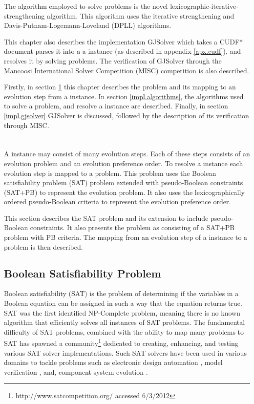 The algorithm employed to solve \modelimpl problems is the novel lexicographic-iterative-strengthening algorithm.
This algorithm uses the iterative strengthening \citep{calistri1994iterative, le2010sat4j} and Davis-Putnam-Logemann-Loveland (DPLL) \citep{Davis1960, davis1962machine} algorithms.

This chapter also describes the implementation GJSolver which takes a CUDF* document parses it into a a \modelname instance (as described in appendix \ref{apx.cudf}),
and resolves it by solving \modelimpl problems.
The verification of GJSolver through the Mancoosi International Solver Competition (MISC) competition is also described.

Firstly, in section \ref{impl.mapping} this chapter describes the \modelimpl problem and its mapping to an evolution step from a \modelname instance.
In section \ref{impl.algorithms}, the algorithms used to solve a \modelimpl problem, and resolve a \modelname instance are described.
Finally, in section \ref{impl.gjsolver} GJSolver is discussed, followed by the description of its verification through MISC.

\section{\modelimpl}
\label{impl.mapping}
A \modelname instance may consist of many evolution steps.
Each of these steps consists of an evolution problem and an evolution preference order.
To resolve a \modelname instance each evolution step is mapped to a \modelimpl problem.
This problem uses the Boolean satisfiability problem (SAT) problem extended with pseudo-Boolean constraints (SAT+PB) to represent the evolution problem.
It also uses the lexicographically ordered pseudo-Boolean criteria to represent the evolution preference order.

This section describes the SAT problem and its extension to include pseudo-Boolean constraints.
It also presents the \modelimpl problem as consisting of a SAT+PB problem with PB criteria. 
The mapping from an evolution step of a \modelname instance to a \modelimpl problem is then described.

\subsection{Boolean Satisfiability Problem}
Boolean satisfiability (SAT) is the problem of determining if the variables in a Boolean equation can be assigned in such a way that the equation returns true.
SAT was the first identified NP-Complete problem, meaning there is no known algorithm that efficiently solves all instances of SAT problems.
The fundamental difficulty of SAT problems, 
combined with the ability to map many problems to SAT has spawned a community\footnote{http://www.satcompetition.org/ accessed 6/3/2012} 
dedicated to creating, enhancing, and testing various SAT solver implementations. 
Such SAT solvers have been used in various domains to tackle problems such as electronic design automation \citep{Marques-Silva2000}, 
model verification \citep{dennis2006}, and, component system evolution \citep{leBerre2010}.

